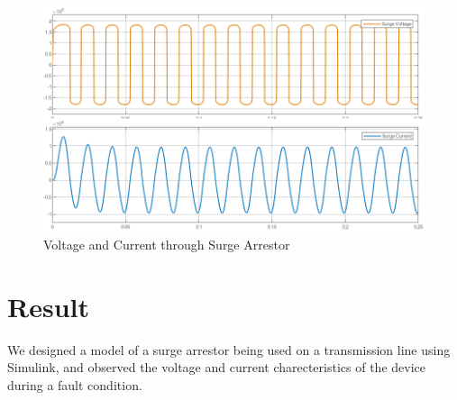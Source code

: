 \documentclass[a4paper,12pt]{article}
\begin{document}
  \begin{figure}[H]
    \centering
    \includegraphics[width=5in]{img/line_surge.png}
    \caption{Voltage and Current through Surge Arrestor}
  \end{figure}

  \section{Result}
  We designed a model of a surge arrestor being used on a transmission line using Simulink,
  and observed the voltage and current charecteristics of the device during a fault condition.
\end{document}
